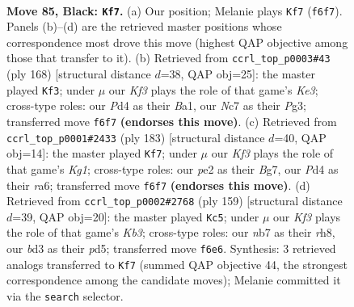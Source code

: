 \documentclass[11pt]{article}
\begin{document}
\clearpage

\begin{figure}[p]\centering
\begin{subfigure}{0.46\textwidth}\centering
\resizebox{\linewidth}{!}{%
\newchessgame
\chessboard[
  setfen={8/1Nn5/5k2/p7/Pb1pP2n/1P1B3p/4P3/2K5 b - - 37 85},
  showmover=false,
  pgfstyle=straightmove, color=movearrow, markmove={f6-f7}
]}
\caption{}
\end{subfigure}\hfill
\begin{subfigure}{0.46\textwidth}\centering
\resizebox{\linewidth}{!}{%
\newchessgame
\chessboard[
  setfen={6k1/1B3p2/Pb4p1/2p1P2p/2b4P/4K1P1/8/B7 w - - 45 85},
  showmover=false,
  pgfstyle=straightmove, color=movearrow, markmove={e3-f3}
]}
\caption{}
\end{subfigure}
\\[4pt]
\begin{subfigure}{0.46\textwidth}\centering
\resizebox{\linewidth}{!}{%
\newchessgame
\chessboard[
  setfen={6k1/6b1/R5p1/5pPp/1r3P1P/4B3/5PK1/8 b - - 48 92},
  showmover=false,
  pgfstyle=straightmove, color=movearrow, markmove={g8-f7}
]}
\caption{}
\end{subfigure}\hfill
\begin{subfigure}{0.46\textwidth}\centering
\resizebox{\linewidth}{!}{%
\newchessgame
\chessboard[
  setfen={7R/8/1k1p4/3Pp2p/4P1bP/r7/5KB1/8 b - - 58 80},
  showmover=false,
  pgfstyle=straightmove, color=movearrow, markmove={b6-c5}
]}
\caption{}
\end{subfigure}
\caption{\textbf{Move 85, Black: \texttt{Kf7}.} (a) Our position; Melanie plays \texttt{Kf7} (\texttt{f6f7}). Panels (b)--(d) are the retrieved master positions whose correspondence most drove this move (highest QAP objective among those that transfer to it). (b) Retrieved from \texttt{ccrl\_top\_p0003\#43} (ply 168) [structural distance $d$=38, QAP obj=25]: the master played \texttt{Kf3}; under $\mu$ our \emph{Kf3} plays the role of that game's \emph{Ke3}; cross-type roles: our \emph{P}d4 as their \emph{B}a1, our \emph{N}c7 as their \emph{P}g3; transferred move \texttt{f6f7} \textbf{(endorses this move)}. (c) Retrieved from \texttt{ccrl\_top\_p0001\#2433} (ply 183) [structural distance $d$=40, QAP obj=14]: the master played \texttt{Kf7}; under $\mu$ our \emph{Kf3} plays the role of that game's \emph{Kg1}; cross-type roles: our \emph{p}e2 as their \emph{B}g7, our \emph{P}d4 as their \emph{r}a6; transferred move \texttt{f6f7} \textbf{(endorses this move)}. (d) Retrieved from \texttt{ccrl\_top\_p0002\#2768} (ply 159) [structural distance $d$=39, QAP obj=20]: the master played \texttt{Kc5}; under $\mu$ our \emph{Kf3} plays the role of that game's \emph{Kb3}; cross-type roles: our \emph{n}b7 as their \emph{r}h8, our \emph{b}d3 as their \emph{p}d5; transferred move \texttt{f6e6}. Synthesis: 3 retrieved analogs transferred to \texttt{Kf7} (summed QAP objective 44, the strongest correspondence among the candidate moves); Melanie committed it via the \texttt{search} selector.}
\label{fig:thought-m169}
\end{figure}
\end{document}

